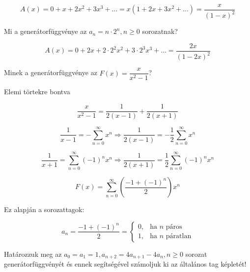 \begin{solution}
\[
A(x)=0+x+2x^{2}+3x^{3}+\dots=x(1+2x+3x^{2}+\dots)=\dfrac{x}{(1-x)^{2}}
\]
\end{solution}
\begin{problem}
Mi a generátorfüggvénye az $a_{n}=n\cdot2^{n},n\geq0$ sorozatnak? 
\end{problem}

\begin{solution}
\[
A(x)=0+2x+2\cdot2^{2}x^{2}+3\cdot2^{3}x^{3}+\dots=\dfrac{2x}{(1-2x)^{2}}
\]
\end{solution}
\begin{problem}
Minek a generátorfüggvénye az $F(x)=\dfrac{x}{x^{2}-1}$? 
\end{problem}

\begin{solution}
Elemi törtekre bontva

\[
\frac{x}{x^{2}-1}=\frac{1}{2(x-1)}+\frac{1}{2(x+1)}
\]

\[
\frac{1}{x-1}=-\sum_{n=0}^{\infty}x^{n}\Rightarrow\frac{1}{2(x-1)}=-\frac{1}{2}\sum_{n=0}^{\infty}x^{n}
\]

\[
\frac{1}{x+1}=\sum_{n=0}^{\infty}(-1)^{n}x^{n}\Rightarrow\frac{1}{2(x+1)}=\frac{1}{2}\sum_{n=0}^{\infty}(-1)^{n}x^{n}
\]

\[
F(x)=\sum_{n=0}^{\infty}\left(\frac{-1+(-1)^{n}}{2}\right)x^{n}
\]

Ez alapján a sorozattagok:

\[
a_{n}=\frac{-1+(-1)^{n}}{2}=\begin{cases}
0, & \text{ha }n\text{ páros}\\
1, & \text{ha }n\text{ páratlan}
\end{cases}
\]
\end{solution}
\begin{problem}
Határozzuk meg az $a_{0}=a_{1}=1,a_{n+2}=4a_{n+1}-4a_{n},n\geq0$
sorozat generátorfüggvényét és ennek segítségével számoljuk ki az
általános tag képletét! 
\end{problem}


